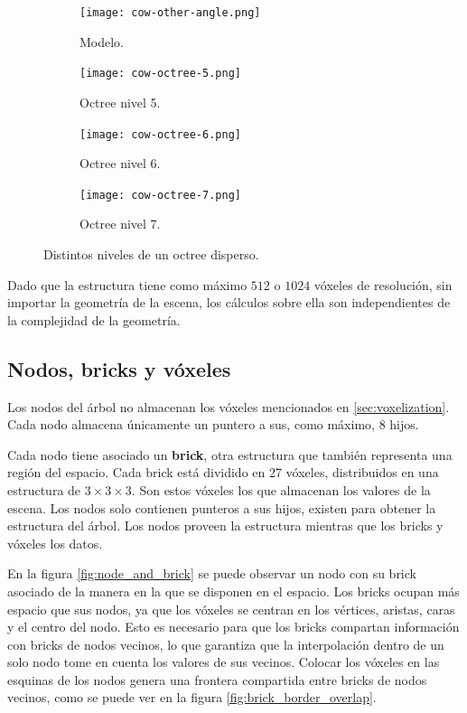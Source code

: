 \begin{figure}[ht]
    \begin{subfigure}{.24\textwidth}
        \centering
        \texttt{[image: cow-other-angle.png]}
        \caption{Modelo.}
    \end{subfigure}
    \begin{subfigure}{.24\textwidth}
        \centering
        \texttt{[image: cow-octree-5.png]}
        \caption{Octree nivel 5.}
    \end{subfigure}
    \begin{subfigure}{.24\textwidth}
        \centering
        \texttt{[image: cow-octree-6.png]}
        \caption{Octree nivel 6.}
    \end{subfigure}
    \begin{subfigure}{.24\textwidth}
        \centering
        \texttt{[image: cow-octree-7.png]}
        \caption{Octree nivel 7.}
    \end{subfigure}
    \caption{Distintos niveles de un octree disperso.}
    \label{fig:octree-levels}
\end{figure}

Dado que la estructura tiene como máximo $512$ o $1024$ vóxeles de resolución, sin importar la geometría de la escena, los cálculos sobre ella son independientes de la complejidad de la geometría.

\subsection{Nodos, bricks y vóxeles}\label{sec:nodes_and_bricks}

Los nodos del árbol no almacenan los vóxeles mencionados en \ref{sec:voxelization}.
Cada nodo almacena únicamente un puntero a sus, como máximo, $8$ hijos.

Cada nodo tiene asociado un \textbf{brick}, otra estructura que también representa una región del espacio.
Cada brick está dividido en 27 vóxeles, distribuidos en una estructura de $3\times3\times3$.
Son estos vóxeles los que almacenan los valores de la escena.
Los nodos solo contienen punteros a sus hijos, existen para obtener la estructura del árbol.
Los nodos proveen la estructura mientras que los bricks y vóxeles los datos.

En la figura \ref{fig:node_and_brick} se puede observar un nodo con su brick asociado de la manera en la que se disponen en el espacio.
Los bricks ocupan más espacio que sus nodos, ya que los vóxeles se centran en los vértices, aristas, caras y el centro del nodo.
Esto es necesario para que los bricks compartan información con bricks de nodos vecinos, lo que garantiza que la interpolación dentro de un solo nodo tome en cuenta los valores de sus vecinos.
Colocar los vóxeles en las esquinas de los nodos genera una frontera compartida entre bricks de nodos vecinos, como se puede ver en la figura \ref{fig:brick_border_overlap}.

